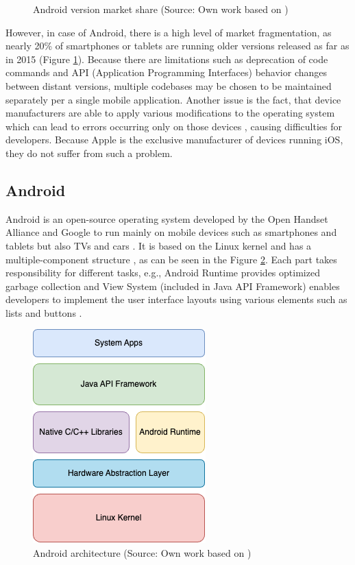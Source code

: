 \begin{figure}[H]
\begin{minipage}{.47\textwidth}
    \caption{Android version market share (Source: Own work based on \cite{statcounter_android_version_market})}
    \label{fig:android_versions}
  \end{minipage}
\end{figure}

However, in case of Android, there is a high level of market fragmentation, as nearly 20\% of smartphones or tablets are running older versions released as far as in 2015 (Figure \ref{fig:android_versions}). Because there are limitations such as deprecation of code commands and API (Application Programming Interfaces) behavior changes between distant versions, multiple codebases may be chosen to be maintained separately per a single mobile application. Another issue is the fact, that device manufacturers are able to apply various modifications to the operating system which can lead to errors occurring only on those devices \cite{comparison_technologies_multiplatform}, causing difficulties for developers. Because Apple is the exclusive manufacturer of devices running iOS, they do not suffer from such a problem. 

\subsection{Android}\label{chap:android}

Android is an open-source operating system developed by the Open Handset Alliance and Google to run mainly on mobile devices such as smartphones and tablets but also TVs and cars \cite{android_what_is,comparison_technologies_multiplatform}. It is based on the Linux kernel and has a multiple-component structure \cite{android_architecture_and_application}, as can be seen in the Figure \ref{fig:android_architecture}. Each part takes responsibility for different tasks, e.g., Android Runtime provides optimized garbage collection and View System (included in Java API Framework) enables developers to implement the user interface layouts using various elements such as lists and buttons \cite{android_architecture}.

\begin{figure}[h]
    \centering
    \includegraphics[scale=0.65]{img/android_architecture}
    \caption{Android architecture (Source: Own work based on \cite{android_architecture})}
    \label{fig:android_architecture}
\end{figure}

